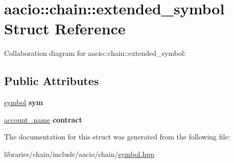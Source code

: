 \hypertarget{structaacio_1_1chain_1_1extended__symbol}{}\section{aacio\+:\+:chain\+:\+:extended\+\_\+symbol Struct Reference}
\label{structaacio_1_1chain_1_1extended__symbol}


Collaboration diagram for aacio\+:\+:chain\+:\+:extended\+\_\+symbol\+:
\subsection*{Public Attributes}
\begin{DoxyCompactItemize}
\item 
\mbox{\label{structaacio_1_1chain_1_1extended__symbol_a667e69d7572b0f314b519c116647f9b4}} 
\mbox{\hyperlink{classaacio_1_1chain_1_1symbol}{symbol}} {\bfseries sym}
\item 
\mbox{\label{structaacio_1_1chain_1_1extended__symbol_a23f4ed2e0652cf89927edec4cfded21e}} 
\mbox{\hyperlink{structaacio_1_1chain_1_1name}{account\+\_\+name}} {\bfseries contract}
\end{DoxyCompactItemize}


The documentation for this struct was generated from the following file\+:\begin{DoxyCompactItemize}
\item 
libraries/chain/include/aacio/chain/\mbox{\hyperlink{symbol_8hpp}{symbol.\+hpp}}\end{DoxyCompactItemize}
